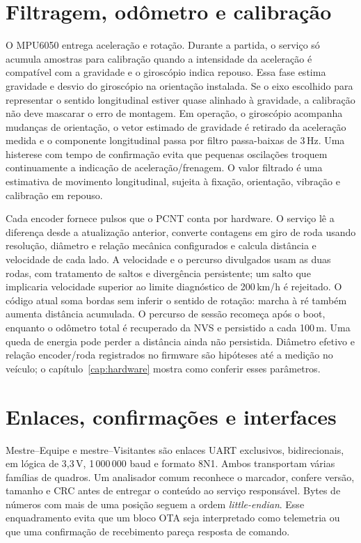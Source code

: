 \section{Filtragem, odômetro e calibração}
O MPU6050 entrega aceleração e rotação. Durante a partida, o serviço só acumula amostras para calibração quando a intensidade da aceleração é compatível com a gravidade e o giroscópio indica repouso. Essa fase estima gravidade e desvio do giroscópio na orientação instalada. Se o eixo escolhido para representar o sentido longitudinal estiver quase alinhado à gravidade, a calibração não deve mascarar o erro de montagem. Em operação, o giroscópio acompanha mudanças de orientação, o vetor estimado de gravidade é retirado da aceleração medida e o componente longitudinal passa por filtro passa-baixas de 3\,Hz. Uma histerese com tempo de confirmação evita que pequenas oscilações troquem continuamente a indicação de aceleração/frenagem. O valor filtrado é uma estimativa de movimento longitudinal, sujeita à fixação, orientação, vibração e calibração em repouso.

Cada encoder fornece pulsos que o PCNT conta por hardware. O serviço lê a diferença desde a atualização anterior, converte contagens em giro de roda usando resolução, diâmetro e relação mecânica configurados e calcula distância e velocidade de cada lado. A velocidade e o percurso divulgados usam as duas rodas, com tratamento de saltos e divergência persistente; um salto que implicaria velocidade superior ao limite diagnóstico de 200\,km/h é rejeitado. O código atual soma bordas sem inferir o sentido de rotação: marcha à ré também aumenta distância acumulada. O percurso de sessão recomeça após o boot, enquanto o odômetro total é recuperado da NVS e persistido a cada 100\,m. Uma queda de energia pode perder a distância ainda não persistida. Diâmetro efetivo e relação encoder/roda registrados no firmware são hipóteses até a medição no veículo; o capítulo~\ref{cap:hardware} mostra como conferir esses parâmetros.

\section{Enlaces, confirmações e interfaces}
Mestre--Equipe e mestre--Visitantes são enlaces UART exclusivos, bidirecionais, em lógica de 3,3\,V, 1\,000\,000 baud e formato 8N1. Ambos transportam várias famílias de quadros. Um analisador comum reconhece o marcador, confere versão, tamanho e CRC antes de entregar o conteúdo ao serviço responsável. Bytes de números com mais de uma posição seguem a ordem \emph{little-endian}. Esse enquadramento evita que um bloco OTA seja interpretado como telemetria ou que uma confirmação de recebimento pareça resposta de comando.

